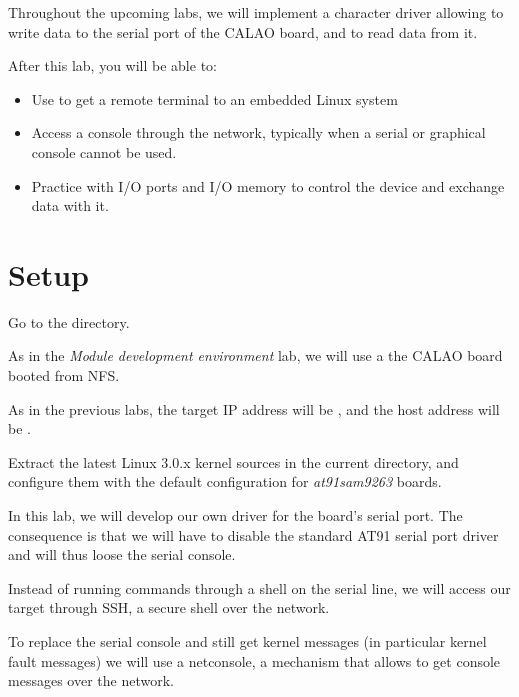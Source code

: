 
Throughout the upcoming labs, we will implement a character driver
allowing to write data to the serial port of the CALAO board, and to
read data from it.

After this lab, you will be able to:

\begin{itemize}

\item Use  to get a remote terminal to an embedded Linux
  system

\item Access a console through the network, typically when a serial or
  graphical console cannot be used.

\item Practice with I/O ports and I/O memory to control the device and
  exchange data with it.

\end{itemize}

\section{Setup}

Go to the  directory.

As in the {\em Module development environment} lab, we will use a the
CALAO board booted from NFS.

As in the previous labs, the target IP address will be ,
and the host address will be .

Extract the latest Linux 3.0.x kernel sources in the current
directory, and configure them with the default configuration for
{\em at91sam9263} boards.

In this lab, we will develop our own driver for the board's serial
port. The consequence is that we will have to disable the standard
AT91 serial port driver and will thus loose the serial console.

Instead of running commands through a shell on the serial line, we
will access our target through SSH, a secure shell over the network.

To replace the serial console and still get kernel messages (in
particular kernel fault messages) we will use a netconsole, a
mechanism that allows to get console messages over the network.

